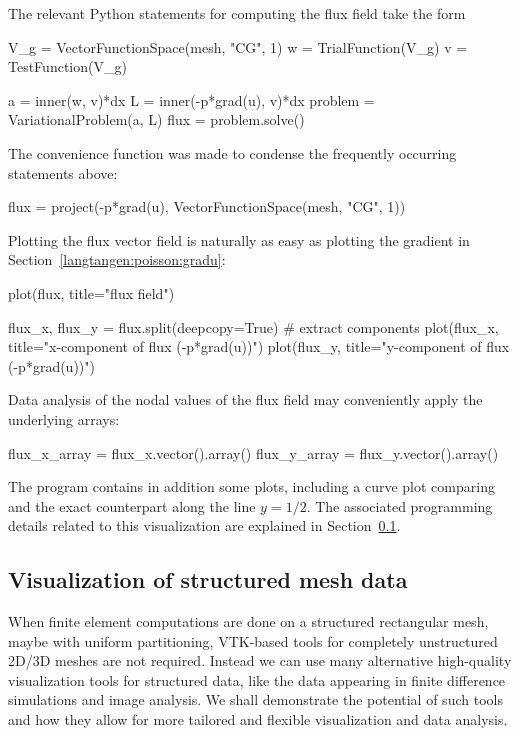The relevant Python statements for computing the flux field take the form
\begin{python}
V_g = VectorFunctionSpace(mesh, "CG", 1)
w = TrialFunction(V_g)
v = TestFunction(V_g)

a = inner(w, v)*dx
L = inner(-p*grad(u), v)*dx
problem = VariationalProblem(a, L)
flux = problem.solve()
\end{python}
The convenience function  was made to condense the frequently
occurring statements above:
\begin{python}
flux = project(-p*grad(u),
               VectorFunctionSpace(mesh, "CG", 1))
\end{python}

Plotting the flux vector field is naturally as easy as plotting
the gradient in Section~\ref{langtangen:poisson:gradu}:
\begin{python}
plot(flux, title="flux field")

flux_x, flux_y = flux.split(deepcopy=True)  # extract components
plot(flux_x, title="x-component of flux (-p*grad(u))")
plot(flux_y, title="y-component of flux (-p*grad(u))")
\end{python}

Data analysis of the nodal values of the flux field may conveniently
apply the underlying  arrays:
\begin{python}
flux_x_array = flux_x.vector().array()
flux_y_array = flux_y.vector().array()
\end{python}

The program  contains in
addition some plots, including a curve plot comparing
 and the exact counterpart along
the line $y=1/2$.  The associated programming details related to this
visualization are explained in Section~\ref{langtangen:structviz}.

\subsection{Visualization of structured mesh data}
\label{langtangen:structviz}

When finite element computations are done on a structured rectangular
mesh, maybe with uniform partitioning, VTK-based tools for completely
unstructured 2D/3D meshes are not required.  Instead we can use many
alternative high-quality visualization tools for structured data, like
the data appearing in finite difference simulations and image
analysis.  We shall demonstrate the potential of such tools and how
they allow for more tailored and flexible visualization and data
analysis.

